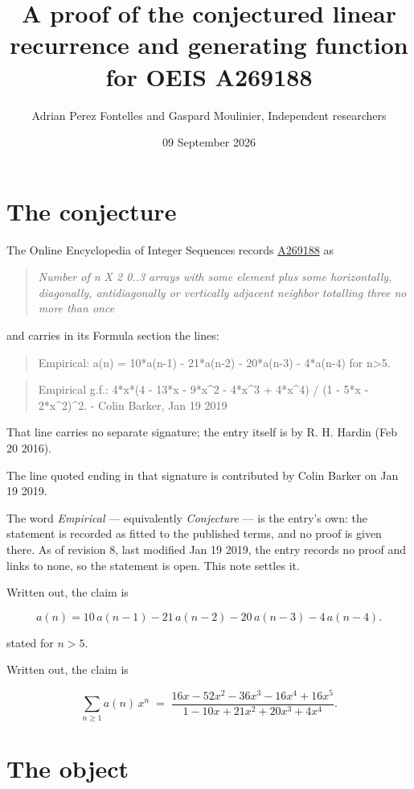 \documentclass[11pt]{article}
\title{A proof of the conjectured linear recurrence and generating function for OEIS A269188}
\author{Adrian Perez Fontelles and Gaspard Moulinier, Independent researchers}
\date{09 September 2026}
\theoremstyle{definition}
\begin{document}
\maketitle
\section{The conjecture}

The Online Encyclopedia of Integer Sequences records \href{https://oeis.org/A269188}{A269188} as

\begin{quote}\itshape Number of n X 2 0..3 arrays with some element plus some horizontally, diagonally, antidiagonally or vertically adjacent neighbor totalling three no more than once\end{quote}

and carries in its Formula section the lines:

\begin{quote}\ttfamily Empirical: a(n) = 10*a(n-1) - 21*a(n-2) - 20*a(n-3) - 4*a(n-4) for n>5.\end{quote}

\begin{quote}\ttfamily Empirical g.f.: 4*x*(4 - 13*x - 9*x\textasciicircum{}2 - 4*x\textasciicircum{}3 + 4*x\textasciicircum{}4) / (1 - 5*x - 2*x\textasciicircum{}2)\textasciicircum{}2. - Colin Barker, Jan 19 2019\end{quote}

That line carries no separate signature; the entry itself is by R. H. Hardin (Feb 20 2016).

The line quoted ending in that signature is contributed by Colin Barker on Jan 19 2019.

The word {\itshape Empirical} --- equivalently {\itshape Conjecture} --- is the entry's own: the statement is recorded as fitted to the published terms, and no proof is given there. As of revision 8, last modified Jan 19 2019, the entry records no proof and links to none, so the statement is open. This note settles it.

Written out, the claim is

\[a(n) = 10\,a(n-1) - 21\,a(n-2) - 20\,a(n-3) - 4\,a(n-4).\]

stated for $n > 5$.

Written out, the claim is

\[\sum_{n \ge 1} a(n)\,x^n \;=\; \frac{16x - 52x^{2} - 36x^{3} - 16x^{4} + 16x^{5}}{1 - 10x + 21x^{2} + 20x^{3} + 4x^{4}}.\]

\section{The object}
\end{document}
